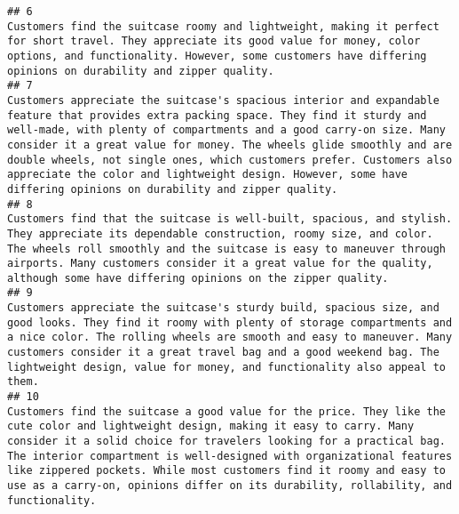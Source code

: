\documentclass[
]{article}
\begin{document}
\begin{verbatim}
## 6                                                                                                                                                                                                                                                                                                                                                                        Customers find the suitcase roomy and lightweight, making it perfect for short travel. They appreciate its good value for money, color options, and functionality. However, some customers have differing opinions on durability and zipper quality.
## 7                                                                                                                                            Customers appreciate the suitcase's spacious interior and expandable feature that provides extra packing space. They find it sturdy and well-made, with plenty of compartments and a good carry-on size. Many consider it a great value for money. The wheels glide smoothly and are double wheels, not single ones, which customers prefer. Customers also appreciate the color and lightweight design. However, some have differing opinions on durability and zipper quality.
## 8                                                                                                                                                                                                                                                                           Customers find that the suitcase is well-built, spacious, and stylish. They appreciate its dependable construction, roomy size, and color. The wheels roll smoothly and the suitcase is easy to maneuver through airports. Many customers consider it a great value for the quality, although some have differing opinions on the zipper quality.
## 9                                                                                                                                                                                                                                                         Customers appreciate the suitcase's sturdy build, spacious size, and good looks. They find it roomy with plenty of storage compartments and a nice color. The rolling wheels are smooth and easy to maneuver. Many customers consider it a great travel bag and a good weekend bag. The lightweight design, value for money, and functionality also appeal to them.
## 10                                                                                                                                                                            Customers find the suitcase a good value for the price. They like the cute color and lightweight design, making it easy to carry. Many consider it a solid choice for travelers looking for a practical bag. The interior compartment is well-designed with organizational features like zippered pockets. While most customers find it roomy and easy to use as a carry-on, opinions differ on its durability, rollability, and functionality.

\end{verbatim}
\end{document}
